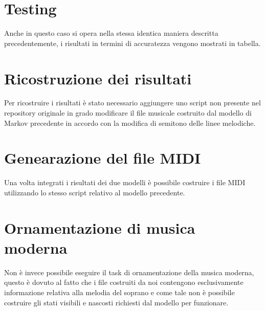\section{Testing}
Anche in questo caso si opera nella stessa identica maniera descritta precedentemente, i risultati in termini di accuratezza vengono mostrati in tabella.
\section{Ricostruzione dei risultati}
Per ricostruire i risultati è stato necessario aggiungere uno script non presente nel repository originale in grado modificare il file musicale costruito dal modello di Markov precedente in accordo con la modifica di semitono delle linee melodiche.
\section{Genearazione del file MIDI}
Una volta integrati i risultati dei due modelli è possibile costruire i file MIDI utilizzando lo stesso script relativo al modello precedente.
\section{Ornamentazione di musica moderna}
Non è invece possibile eseguire il task di ornamentazione della musica moderna, questo è dovuto al fatto che i file costruiti da noi contengono esclusivamente informazione relativa alla melodia del soprano e come tale non è possibile costruire gli stati visibili e nascosti richiesti dal modello per funzionare.
  